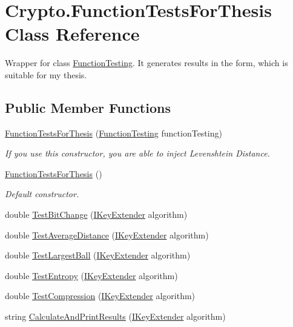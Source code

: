 \hypertarget{class_crypto_1_1_function_tests_for_thesis}{}\section{Crypto.\+Function\+Tests\+For\+Thesis Class Reference}
\label{class_crypto_1_1_function_tests_for_thesis}


Wrapper for class {\ttfamily \hyperlink{class_crypto_1_1_function_testing}{Function\+Testing}}. It generates results in the form, which is suitable for my thesis.  


\subsection*{Public Member Functions}
\begin{DoxyCompactItemize}
\item 
\hyperlink{class_crypto_1_1_function_tests_for_thesis_a06d8a9ea427bd3132909b7e20f949265}{Function\+Tests\+For\+Thesis} (\hyperlink{class_crypto_1_1_function_testing}{Function\+Testing} function\+Testing)
\begin{DoxyCompactList}\small\item\em If you use this constructor, you are able to inject Levenshtein Distance. \end{DoxyCompactList}\item 
\hyperlink{class_crypto_1_1_function_tests_for_thesis_a5111eb586e377ffc77887854a97a6e12}{Function\+Tests\+For\+Thesis} ()
\begin{DoxyCompactList}\small\item\em Default constructor. \end{DoxyCompactList}\item 
double \hyperlink{class_crypto_1_1_function_tests_for_thesis_ac1f19a5222e2ea9dd548115f5d27d625}{Test\+Bit\+Change} (\hyperlink{interface_crypto_1_1_i_key_extender}{I\+Key\+Extender} algorithm)
\item 
double \hyperlink{class_crypto_1_1_function_tests_for_thesis_aa4c816a858cf43da9d4483b6b681b7e9}{Test\+Average\+Distance} (\hyperlink{interface_crypto_1_1_i_key_extender}{I\+Key\+Extender} algorithm)
\item 
double \hyperlink{class_crypto_1_1_function_tests_for_thesis_af91fad42f0f9f07c9856159e8a77efcf}{Test\+Largest\+Ball} (\hyperlink{interface_crypto_1_1_i_key_extender}{I\+Key\+Extender} algorithm)
\item 
double \hyperlink{class_crypto_1_1_function_tests_for_thesis_a286fefd74161e48ca2bc1d1c84134f74}{Test\+Entropy} (\hyperlink{interface_crypto_1_1_i_key_extender}{I\+Key\+Extender} algorithm)
\item 
double \hyperlink{class_crypto_1_1_function_tests_for_thesis_aa8d949ca13be79e8f42b441dbf2faf11}{Test\+Compression} (\hyperlink{interface_crypto_1_1_i_key_extender}{I\+Key\+Extender} algorithm)
\item 
string \hyperlink{class_crypto_1_1_function_tests_for_thesis_ae61b66d865e06140e6b6b58d14e0790e}{Calculate\+And\+Print\+Results} (\hyperlink{interface_crypto_1_1_i_key_extender}{I\+Key\+Extender} algorithm)
\end{DoxyCompactItemize}


